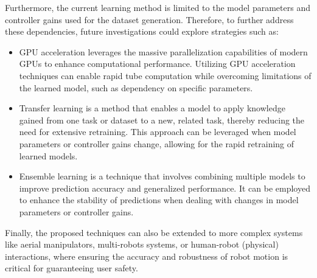 Furthermore, the current learning method is limited to the model parameters and controller gains used for the dataset generation.
Therefore, to further address these dependencies, future investigations could explore strategies such as:
\begin{itemize}
    \item GPU acceleration leverages the massive parallelization capabilities of modern GPUs to enhance computational performance. 
    Utilizing GPU acceleration techniques can enable rapid tube computation while overcoming limitations of the learned model, such as dependency on specific parameters.
    \item Transfer learning is a method that enables a model to apply knowledge gained from one task or dataset to a new, related task, thereby reducing the need for extensive retraining. 
    This approach can be leveraged when model parameters or controller gains change, allowing for the rapid retraining of learned models.
    \item Ensemble learning is a technique that involves combining multiple models to improve prediction accuracy and generalized performance. 
    It can be employed to enhance the stability of predictions when dealing with changes in model parameters or controller gains.
\end{itemize}

Finally, the proposed techniques can also be extended to more complex systems like aerial manipulators, multi-robots systems, or human-robot (physical) interactions, where ensuring the accuracy and robustness of robot motion is critical for guaranteeing user safety.